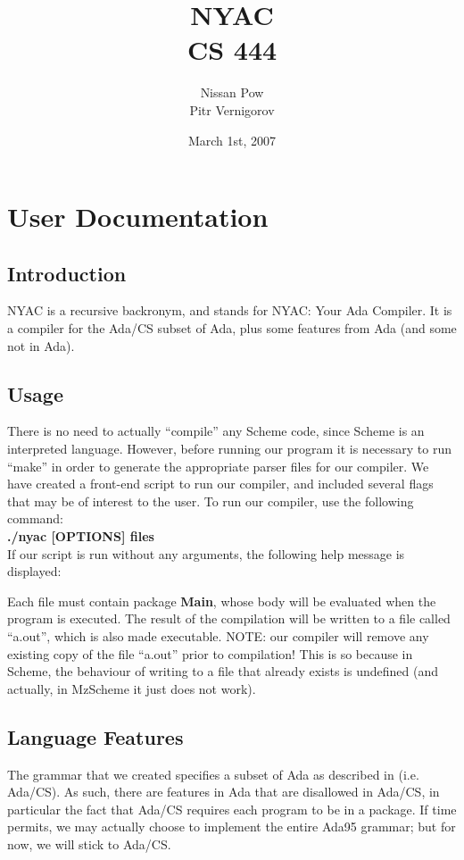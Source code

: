 \documentclass[onecolumn,11pt]{article}
\title{NYAC \\ CS 444\\}
\author{Nissan Pow \\ Pitr Vernigorov}
\date{March 1st, 2007}
\begin{document}
\maketitle

\tableofcontents

\section{User Documentation}

\subsection{Introduction}
NYAC is a recursive backronym, and stands for NYAC: Your Ada Compiler. It is a compiler for the Ada/CS subset of Ada, plus some features from Ada (and some not in Ada).

\subsection{Usage}

There is no need to actually ``compile'' any Scheme code, since Scheme is an interpreted language. However, before running our program it is necessary to run ``make'' in order to generate the appropriate parser files for our compiler. We have created a front-end script to run our compiler, and included several flags that may be of interest to the user. To run our compiler, use the following command: \\

\textbf{./nyac [OPTIONS] files} \\

If our script is run without any arguments, the following help message is displayed: \\
\begin{alltt}
\end{alltt}
Each file must contain package \textbf{Main}, whose body will be evaluated when the program is executed. The result of the compilation will be written to a file called ``a.out'', which is also made executable. NOTE: our compiler will remove any existing copy of the file ``a.out'' prior to compilation! This is so because in Scheme, the behaviour of writing to a file that already exists is undefined (and actually, in MzScheme it just does not work).

\subsection{Language Features}
The grammar that we created specifies a subset of Ada as described in \cite{fischer88} (i.e. Ada/CS). As such, there are features in Ada that are disallowed in Ada/CS, in particular the fact that Ada/CS requires each program to be in a package. If time permits, we may actually choose to implement the entire Ada95 grammar; but for now, we will stick to Ada/CS. \\
\end{document}
